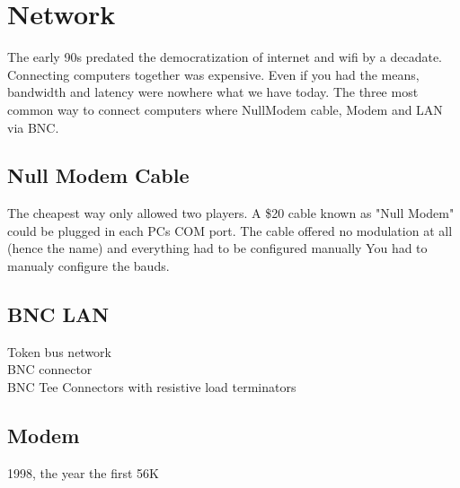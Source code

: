 \section{Network}
The early 90s predated the democratization of internet and wifi by a decadate. Connecting computers together was expensive. Even if you had the means, bandwidth and latency were nowhere what we have today. The three most common way to connect computers where NullModem cable, Modem and LAN via BNC.\\
\par









\subsection{Null Modem Cable}
The cheapest way only allowed two players. A \$20 cable known as "Null Modem" could be plugged in each PCs COM port. The cable offered no modulation at all (hence the name) and everything had to be configured manually You had to manualy configure the bauds.\\
\par 
{}








\subsection{BNC LAN}
Token bus network\\
BNC connector\\
BNC Tee Connectors with resistive load terminators\\









\subsection{Modem}
1998, the year the first 56K\\
\par

